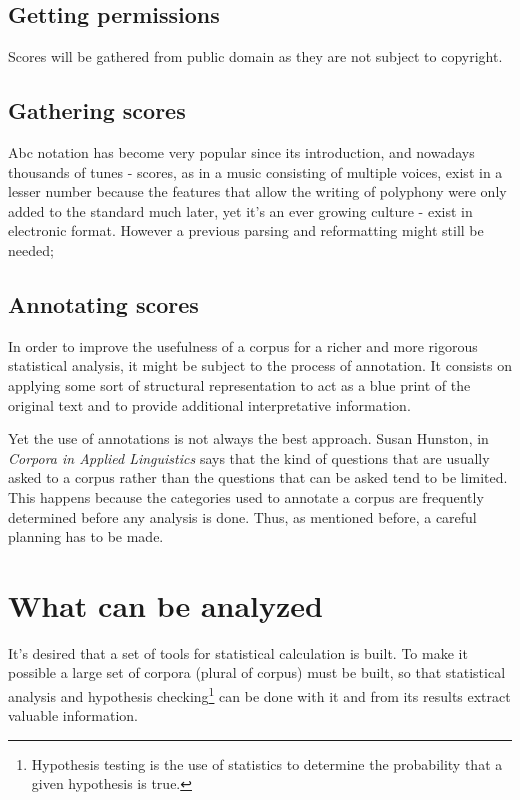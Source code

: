\documentclass[main.tex]{files}
\begin{document}
\subsection{Getting permissions}

Scores will be gathered from public domain as they are not subject to copyright.

\subsection{Gathering scores}

Abc notation has become very popular since its introduction, and nowadays thousands of tunes -
scores, as in a music consisting of multiple voices, exist in a lesser number because the
features that allow the writing of polyphony were only added to the standard much later, yet
it's an ever growing culture - exist in electronic format. However a previous parsing and
reformatting might still be needed;

\subsection{Annotating scores}

In order to improve the usefulness of a corpus for a richer and more rigorous statistical analysis,
it might be subject to the process of annotation. It consists on applying some sort of structural
representation to act as a blue print of the original text and to provide additional interpretative
information.

Yet the use of annotations is not always the best approach. Susan Hunston, in
\textit{Corpora in Applied Linguistics}\cite{hunston2002corpora} says that the kind of questions
that are usually asked to a corpus rather than the questions that can be asked tend to be limited.
This happens because the categories used to annotate a corpus are frequently determined
before any analysis is done. Thus, as mentioned before, a careful planning has to be made.


\section{What can be analyzed} 

It's desired that a set of tools for statistical calculation is built. To make it possible a large
set of corpora (plural of corpus) must be built, so that statistical analysis and hypothesis
checking\footnote{Hypothesis testing is the use of statistics to determine the probability that a
given hypothesis is true.} can be done with it and from its results extract valuable information.
\end{document}

